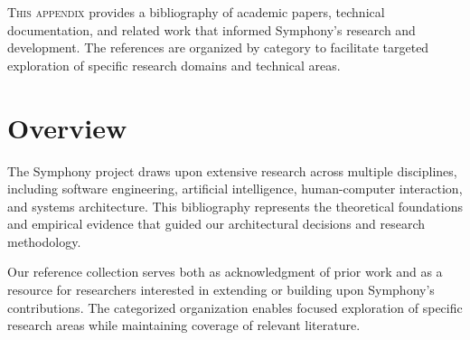 \label{app:references-bibliography}


\lettrine{T}{his appendix} provides a bibliography of academic papers, technical documentation, and related work that informed Symphony's research and development. The references are organized by category to facilitate targeted exploration of specific research domains and technical areas.

\section*{Overview}

The Symphony project draws upon extensive research across multiple disciplines, including software engineering, artificial intelligence, human-computer interaction, and systems architecture. This bibliography represents the theoretical foundations and empirical evidence that guided our architectural decisions and research methodology.

Our reference collection serves both as acknowledgment of prior work and as a resource for researchers interested in extending or building upon Symphony's contributions. The categorized organization enables focused exploration of specific research areas while maintaining coverage of relevant literature.





